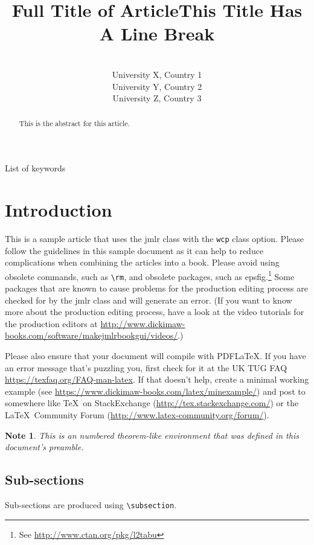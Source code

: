 \documentclass[pmlr,twocolumn,10pt]{jmlr} %
\title[Short Title]{Full Title of Article\titlebreak This Title Has
A Line Break}
\author{%
\Name{First Author 1}\equal{These authors contributed equally} \Email{abc@sample.com}\\
\addr University X, Country 1
\AND
\Name{First Author 2}\footnotemark[1] \Email{def@sample.com}\\
\addr University Y, Country 2
\AND
\Name{Last Author} \Email{ghi@sample.com}\\
\addr University Z, Country 3
}
\newtheorem*{note}{Note}
\begin{document}
\maketitle

\begin{abstract}
This is the abstract for this article.
\end{abstract}
\begin{keywords}
List of keywords
\end{keywords}

\section{Introduction}
\label{sec:intro}

This is a sample article that uses the \textsf{jmlr} class with
the \texttt{wcp} class option.  Please follow the guidelines in
this sample document as it can help to reduce complications when
combining the articles into a book. Please avoid using obsolete
commands, such as \verb|\rm|, and obsolete packages, such as
\textsf{epsfig}.\footnote{See
\url{http://www.ctan.org/pkg/l2tabu}} Some packages that are known
to cause problems for the production editing process are checked for
by the \textsf{jmlr} class and will generate an error. (If you want
to know more about the production editing process, have a look at
the video tutorials for the production editors at
\url{http://www.dickimaw-books.com/software/makejmlrbookgui/videos/}.)

Please also ensure that your document will compile with PDF\LaTeX.
If you have an error message that's puzzling you, first check for it
at the UK TUG FAQ
\url{https://texfaq.org/FAQ-man-latex}.  If
that doesn't help, create a minimal working example (see
\url{https://www.dickimaw-books.com/latex/minexample/}) and post
to somewhere like \TeX\ on StackExchange
(\url{http://tex.stackexchange.com/}) or the \LaTeX\ Community Forum
(\url{http://www.latex-community.org/forum/}).

\begin{note}
This is an numbered theorem-like environment that was defined in
this document's preamble.
\end{note}

\subsection{Sub-sections}

Sub-sections are produced using \verb|\subsection|.
\end{document}
